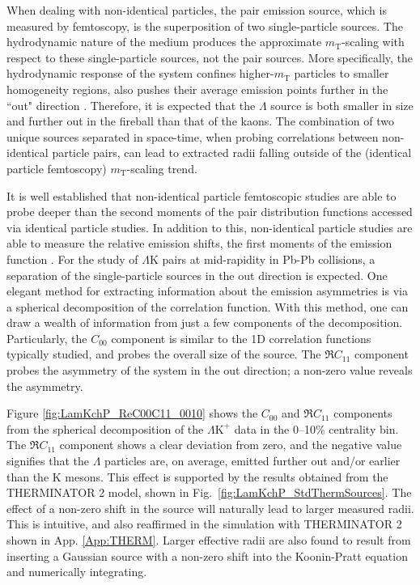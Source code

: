\documentclass[ALICE,manyauthors]{cernphprep}
\newcommand{\mt}{$m_{\mathrm{T}}$\xspace}
\newcommand{\Lam}{$\Lambda$\xspace}
\newcommand{\LamK}{$\Lambda$K\xspace}
\newcommand{\LamKchP}{$\Lambda\mathrm{K^{+}}$\xspace}
\begin{document}
When dealing with non-identical particles, the pair emission source, which is measured by femtoscopy, is the superposition of two single-particle sources.
The hydrodynamic nature of the medium produces the approximate \mt-scaling with respect to these single-particle sources, not the pair sources.
More specifically, the hydrodynamic response of the system confines higher-\mt particles to smaller homogeneity regions, also pushes their average emission points further in the ``out" direction \cite{Retiere:2003kf}.
Therefore, it is expected that the \Lam source is both smaller in size and further out in the fireball than that of the kaons.
The combination of two unique sources separated in space-time, when probing correlations between non-identical particle pairs, can lead to extracted radii falling outside of the (identical particle femtoscopy) \mt-scaling trend.

It is well established that non-identical particle femtoscopic studies are able to probe deeper than the second moments of the pair distribution functions accessed via identical particle studies.
In addition to this, non-identical particle studies are able to measure the relative emission shifts, the first moments of the emission function \cite{Kisiel:2009eh}.
For the study of \LamK pairs at mid-rapidity in Pb-Pb collisions, a separation of the single-particle sources in the out direction is expected.
One elegant method for extracting information about the emission asymmetries is via a spherical decomposition of the correlation function.
With this method, one can draw a wealth of information from just a few components of the decomposition.
Particularly, the $C_{00}$ component is similar to the 1D correlation functions typically studied, and probes the overall size of the source.
The $\Re C_{11}$ component probes the asymmetry of the system in the out direction; a non-zero value reveals the asymmetry. 


Figure \ref{fig:LamKchP_ReC00C11_0010} shows the $C_{00}$ and $\Re C_{11}$ components from the spherical decomposition of the \LamKchP data in the 0--10\% centrality bin.
The $\Re C_{11}$ component shows a clear deviation from zero, and the negative value signifies that the \Lam particles are, on average, emitted further out and/or earlier than the K mesons.
This effect is supported by the results obtained from the THERMINATOR 2 model, shown in Fig.\ \ref{fig:LamKchP_StdThermSources}.
The effect of a non-zero shift in the source will naturally lead to larger measured radii.
This is intuitive, and also reaffirmed in the simulation with THERMINATOR 2 shown in App. \ref{App:THERM}.
Larger effective radii are also found to result from inserting a Gaussian source with a non-zero shift into the Koonin-Pratt equation and numerically integrating.
\end{document}
